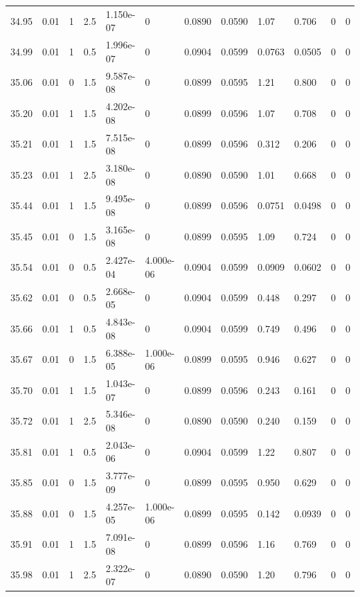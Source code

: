 \documentclass[preview]{standalone}
\begin{document}
{{{{{{{\begin{tabular}{L{1.2cm}C{1.2cm} C{0.3cm}C{0.5cm} C{1.4cm}C{1.4cm} C{1.4cm}C{1.4cm} C{1.6cm}C{1.6cm} C{1.6cm}C{1.6cm}}
  34.95  &  0.01  & 1     & 2.5 &  1.150e-07  & 0  &  0.0890&   0.0590& 1.07 & 0.706   &  0 & 0  \\ 
  34.99  &  0.01  & 1     & 0.5 &  1.996e-07  & 0  &  0.0904&   0.0599& 0.0763 & 0.0505   &  0 & 0  \\ 
  35.06  &  0.01  & 0     & 1.5 &  9.587e-08  & 0  &  0.0899&   0.0595& 1.21 & 0.800   &  0 & 0  \\ 
  35.20  &  0.01  & 1     & 1.5 &  4.202e-08  & 0  &  0.0899&   0.0596& 1.07 & 0.708   &  0 & 0  \\ 
  35.21  &  0.01  & 1     & 1.5 &  7.515e-08  & 0  &  0.0899&   0.0596& 0.312 & 0.206   &  0 & 0  \\ 
  35.23  &  0.01  & 1     & 2.5 &  3.180e-08  & 0  &  0.0890&   0.0590& 1.01 & 0.668   &  0 & 0  \\ 
  35.44  &  0.01  & 1     & 1.5 &  9.495e-08  & 0  &  0.0899&   0.0596& 0.0751 & 0.0498   &  0 & 0  \\ 
  35.45  &  0.01  & 0     & 1.5 &  3.165e-08  & 0  &  0.0899&   0.0595& 1.09 & 0.724   &  0 & 0  \\ 
  35.54  &  0.01  & 0     & 0.5 &  2.427e-04  & 4.000e-06  &  0.0904&   0.0599& 0.0909 & 0.0602   &  0 & 0  \\ 
  35.62  &  0.01  & 0     & 0.5 &  2.668e-05  & 0  &  0.0904&   0.0599& 0.448 & 0.297   &  0 & 0  \\ 
  35.66  &  0.01  & 1     & 0.5 &  4.843e-08  & 0  &  0.0904&   0.0599& 0.749 & 0.496   &  0 & 0  \\ 
  35.67  &  0.01  & 0     & 1.5 &  6.388e-05  & 1.000e-06  &  0.0899&   0.0595& 0.946 & 0.627   &  0 & 0  \\ 
  35.70  &  0.01  & 1     & 1.5 &  1.043e-07  & 0  &  0.0899&   0.0596& 0.243 & 0.161   &  0 & 0  \\ 
  35.72  &  0.01  & 1     & 2.5 &  5.346e-08  & 0  &  0.0890&   0.0590& 0.240 & 0.159   &  0 & 0  \\ 
  35.81  &  0.01  & 1     & 0.5 &  2.043e-06  & 0  &  0.0904&   0.0599& 1.22 & 0.807   &  0 & 0  \\ 
  35.85  &  0.01  & 0     & 1.5 &  3.777e-09  & 0  &  0.0899&   0.0595& 0.950 & 0.629   &  0 & 0  \\ 
  35.88  &  0.01  & 0     & 1.5 &  4.257e-05  & 1.000e-06  &  0.0899&   0.0595& 0.142 & 0.0939   &  0 & 0  \\ 
  35.91  &  0.01  & 1     & 1.5 &  7.091e-08  & 0  &  0.0899&   0.0596& 1.16 & 0.769   &  0 & 0  \\ 
  35.98  &  0.01  & 1     & 2.5 &  2.322e-07  & 0  &  0.0890&   0.0590& 1.20 & 0.796   &  0 & 0  \\ 

\end{tabular}}}}}}}}
\end{document}
